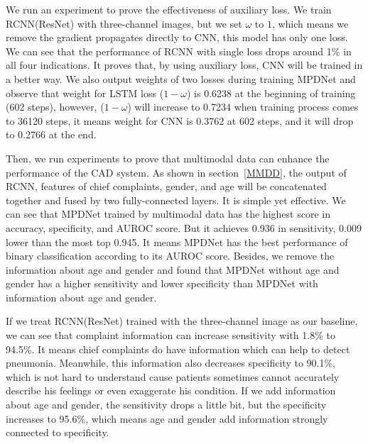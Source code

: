 We run an experiment to prove the effectiveness of auxiliary loss. We train RCNN(ResNet) with three-channel images, but we set $\omega$ to $1$, which means we remove the gradient propagates directly to CNN, this model has only one loss. We can see that the performance of RCNN with single loss drops around 1\% in all four indications. It proves that, by using auxiliary loss, CNN will be trained in a better way. We also output weights of two losses during training MPDNet and observe that weight for LSTM loss ($1 - \omega$) is 0.6238 at the beginning of training (602 steps), however, ($1 - \omega$) will increase to 0.7234 when training process comes to 36120 steps, it means weight for CNN is 0.3762 at 602 steps, and it will drop to 0.2766 at the end. 

Then, we run experiments to prove that multimodal data can enhance the performance of the CAD system. As shown in section~\ref{MMDD}, the output of RCNN, features of chief complaints, gender, and age will be concatenated together and fused by two fully-connected layers. It is simple yet effective. We can see that MPDNet trained by multimodal data has the highest score in accuracy, specificity, and AUROC score. But it achieves 0.936 in sensitivity, 0.009 lower than the most top 0.945. It means MPDNet has the best performance of binary classification according to its AUROC score. 
Besides, we remove the information about age and gender and found that MPDNet without age and gender has a higher sensitivity and lower specificity than MPDNet with information about age and gender. 
    
If we treat RCNN(ResNet) trained with the three-channel image as our baseline, we can see that complaint information can increase sensitivity with 1.8\% to 94.5\%. It means chief complaints do have information which can help to detect pneumonia. Meanwhile, this information also decreases specificity to 90.1\%, which is not hard to understand cause patients sometimes cannot accurately describe his feelings or even exaggerate his condition. If we add information about age and gender, the sensitivity drops a little bit, but the specificity increases to 95.6\%, which means age and gender add information strongly connected to specificity.

